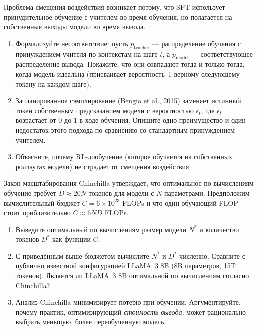\begin{exercise}
\label{ex:sft-exposure-bias}
Проблема смещения воздействия возникает потому, что SFT использует принудительное обучение с учителем во время обучения, но полагается на собственные выходы модели во время вывода.
\begin{enumerate}
  \item Формализуйте несоответствие: пусть $p_{\mathrm{teacher}}$ --- распределение обучения с принуждением учителя по контекстам на шаге $t$, а $p_{\mathrm{model}}$ --- соответствующее распределение вывода. Покажите, что они совпадают тогда и только тогда, когда модель идеальна (присваивает вероятность~1 верному следующему токену на каждом шаге).
  \item Запланированное сэмплирование (Bengio et al., 2015) заменяет истинный токен собственным предсказанием модели с вероятностью $\epsilon_t$, где $\epsilon_t$ возрастает от 0 до 1 в ходе обучения. Опишите одно преимущество и один недостаток этого подхода по сравнению со стандартным принуждением учителем.
  \item Объясните, почему RL-дообучение (которое обучается на собственных роллаутах модели) не страдает от смещения воздействия.
\end{enumerate}
\end{exercise}

\begin{exercise}
\label{ex:chinchilla}
Закон масштабирования Chinchilla утверждает, что оптимальное по вычислениям обучение требует $D \approx 20N$ токенов для модели с $N$ параметрами. Предположим вычислительный бюджет $C = 6 \times 10^{23}$ FLOPs и что один обучающий FLOP стоит приблизительно $C \approx 6ND$ FLOPs.
\begin{enumerate}
  \item Выведите оптимальный по вычислениям размер модели $N^*$ и количество токенов $D^*$ как функции $C$.
  \item С приведённым выше бюджетом вычислите $N^*$ и $D^*$ численно. Сравните с публично известной конфигурацией LLaMA~3 8B (8B параметров, 15T токенов). Является ли LLaMA~3 8B оптимальной по вычислениям согласно Chinchilla?
  \item Анализ Chinchilla минимизирует потерю при обучении. Аргументируйте, почему практик, оптимизирующий \emph{стоимость вывода}, может рационально выбрать меньшую, более переобученную модель.
\end{enumerate}
\end{exercise}

